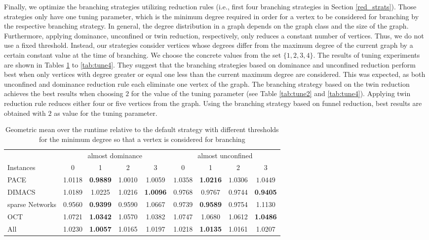 \documentclass[12pt,a4paper,twoside]{scrartcl}
\numberwithin{equation}{section}
\begin{document}
Finally, we optimize the branching strategies utilizing reduction rules (i.e., first four branching strategies in Section \ref{red_strats}). Those strategies only have one tuning parameter, which is the minimum degree required in order for a vertex to be considered for branching by the respective branching strategy. In general, the degree distribution in a graph depends on the graph class and the size of the graph. Furthermore, applying dominance, unconfined or twin reduction, respectively, only reduces a constant number of vertices. Thus, we do not use a fixed threshold. Instead, our strategies consider vertices whose degrees differ from the maximum degree of the current graph by a certain constant value at the time of branching. We choose the concrete values from the set $\{1,2,3,4\}$. The results of tuning experiments are shown in Tables \ref{tab:tune1} to \ref{tab:tune4}. They suggest that the branching strategies based on dominance and unconfined reduction perform best when only vertices with degree greater or equal one less than the current maximum degree are considered. This was expected, as both unconfined and dominance reduction rule each eliminate one vertex of the graph. The branching strategy based on the twin reduction achieves the best results when choosing $2$ for the value of the tuning parameter (see Table \ref{tab:tune2} and \ref{tab:tune4}). Applying twin reduction rule reduces either four or five vertices from the graph. Using the branching strategy based on funnel reduction, best results are obtained with $2$ as value for the tuning parameter.

\begin{table}[hbt!]
	\centering
	\begin{tabular}{l|cccc|cccc|}	  & \multicolumn{4}{c|}{almost dominance} & \multicolumn{4}{c|}{almost unconfined} \\
		Instances & 0 & 1 & 2 & 3 & 0 & 1 & 2 & 3 \\ \hline
		PACE & 1.0118 & \textbf{0.9889} & 1.0010 & 1.0059 & $1.0358$ & \textbf{1.0216} & $1.0306$ & $1.0449$ \\
		DIMACS & 1.0189 & 1.0225 & 1.0216 & \textbf{1.0096} & 0.9768 & 0.9767 & 0.9744 & \textbf{0.9405}  \\
		sparse Networks & 0.9560 & \textbf{0.9399} & 0.9590 & 1.0667 & 0.9739 & \textbf{0.9589} & 0.9754 & 1.1130  \\
		OCT & 1.0721 & \textbf{1.0342} & 1.0570 & 1.0382 & 1.0747 & 1.0680 & 1.0612 & \textbf{1.0486} \\
		All & 1.0230 & \textbf{1.0057} & 1.0165 & 1.0197 & 1.0218 & \textbf{1.0135} & 1.0161 & 1.0207  \\
	\end{tabular}
	\caption{Geometric mean over the runtime relative to the default strategy with different thresholds for the minimum degree so that a vertex is considered for branching}
	\label{tab:tune1}
	
\end{table}
\end{document}
